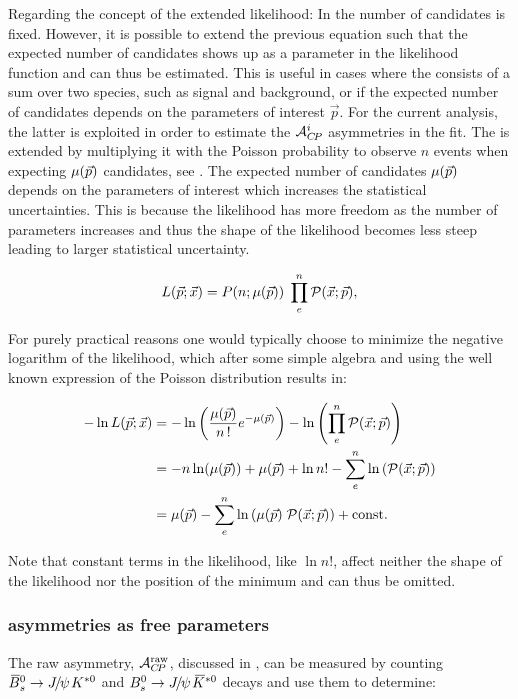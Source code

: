 Regarding the concept of the extended likelihood: In  the number of candidates is fixed.
However, it is possible to extend the previous equation such that the expected number of candidates shows up as a parameter in the likelihood
function and can thus be estimated. This is useful in cases where the \pdf consists of a sum over two species, such as signal and background,
or if the expected number of candidates depends on the parameters of interest $\vec{p}$. For the current analysis, the latter is
exploited in order to estimate the $\mathcal{A}_{C\!P}^{i}$ asymmetries in the fit. The \pdf is extended by multiplying it with the Poisson
probability to observe $n$ events when expecting $\mu({\vec{p}}) $ candidates, see .
The expected number of candidates $\mu({\vec{p}}) $ depends on the
parameters of interest which increases the statistical uncertainties. This is because the likelihood has more freedom
as the number of parameters increases and thus the shape of the likelihood becomes less steep leading to larger statistical
uncertainty.

\begin{equation}
  \centering
L(\vec{p};\vec{x}) = P(n;\expEvnts) \; \prod_e^n \mathcal{P}(\vec{x};\vec{p}),
\label{extlikelihood}
\end{equation}

For purely practical reasons one would typically choose to minimize the negative logarithm of the likelihood, which after some simple
algebra and using the well known expression of the Poisson distribution results in:

\begin{align}
  \centering
  -\nll &= -\ln\left( \frac{\expEvnts}{n\,!} e^{-\expEvnts } \right) - \ln\left( \prod_e^n \mathcal{P}(\vec{x};\vec{p}) \right)  \nonumber \\
        &= - n\ln(\expEvnts) + \expEvnts  + \ln n! - \sum_e^n \ln\parenthesis{\mathcal{P}(\vec{x};\vec{p})} \nonumber \\
        &=  \expEvnts  - \sum_e^n \ln\parenthesis{\expEvnts \; \mathcal{P}(\vec{x};\vec{p}) } + {\rm const}.
\label{extloglikelihood}
\end{align}

\noindent Note that constant terms in the likelihood, like $\ln n!$, affect neither the shape of the likelihood
nor the position of the minimum and can thus be omitted.

\subsubsection{\CP asymmetries as free parameters}
\label{cp_assymetries_and_total_decay_rate}
The raw asymmetry, $\mathcal{A}_{C\!P}^{\rm raw}$, discussed in , can be measured by counting
$\BsbarJpsiKst$ and $\BsJpsiKst$ decays and use them to determine:

